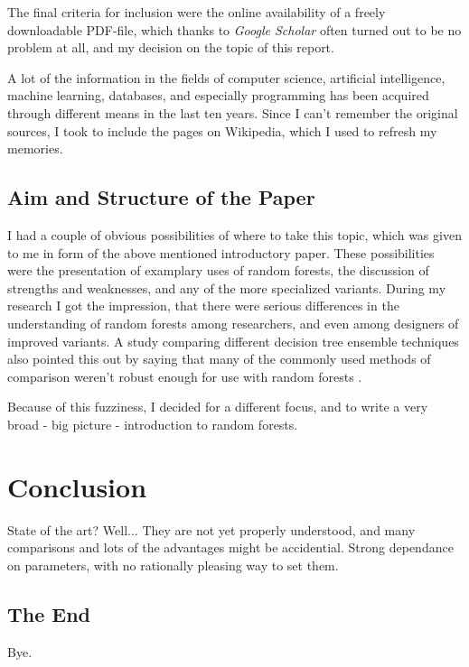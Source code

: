 \documentclass[a4paper,man,12pt,apacite]{apa6} %
\begin{document}
The final criteria for inclusion were the online availability of a freely
downloadable PDF-file, which thanks to \emph{Google Scholar} often turned
out to be no problem at all, and my decision on the topic of
this report.

A lot of the information in the fields of computer science, artificial
intelligence, machine learning, databases, and especially programming
has been acquired through different means in the last ten years.
Since I can't remember the original sources, I took to include the pages
on Wikipedia, which I used to refresh my memories.

\subsection{Aim and Structure of the Paper}
I had a couple of obvious possibilities of where to take this topic, which
was given to me in form of the above mentioned introductory paper.
These possibilities were the presentation of examplary uses of random
forests, the discussion of strengths and weaknesses, and any of the more
specialized variants.
During my research I got the impression, that there were serious
differences in the understanding of random forests among researchers,
and even among designers of improved variants.
A study comparing different decision tree ensemble techniques also pointed
this out by saying that many of the commonly used methods of comparison
weren't robust enough for use with random forests \cite{banfield2007comparison}.

Because of this fuzziness, I decided for a different focus, and to write
a very broad - big picture - introduction to random forests.

\section{Conclusion}
State of the art? Well... They are not yet properly understood, and
many comparisons and lots of the advantages might be accidential.
Strong dependance on parameters, with no rationally pleasing way to set them.

\subsection{The End}
Bye.


\end{document}
